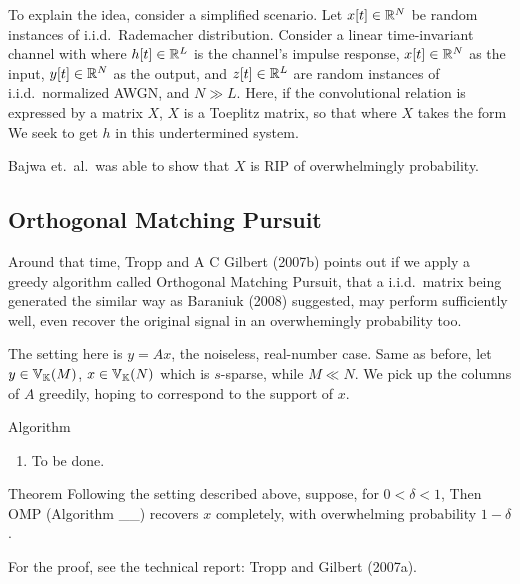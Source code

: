 To explain the idea, consider a simplified scenario.
Let \(x[t] \in \mathbb{R}^N\) be random instances of i.i.d.\ Rademacher distribution.
Consider a linear time-invariant channel with
%
%
where \(h[t] \in \mathbb{R}^L\) is the channel's impulse response, \(x[t] \in \mathbb{R}^N\) as the input, \(y[t] \in \mathbb{R}^N\) as the output, and \(z[t] \in \mathbb{R}^L\) are random instances of i.i.d.\ normalized AWGN, and \(N \gg L\).
Here, if the convolutional relation is expressed by a matrix \(X\), \(X\) is a Toeplitz matrix, so that
%
%
where \(X\) takes the form
%
%
We seek to get \(h\) in this undertermined system.

Bajwa et.\ al.\ was able to show that \(X\) is RIP of overwhelmingly probability.

\subsection{Orthogonal Matching Pursuit}

Around that time, Tropp and A C Gilbert (2007b) points out if we apply a greedy algorithm called Orthogonal Matching Pursuit, that a i.i.d.\ matrix being generated the similar way as Baraniuk (2008) suggested, may perform sufficiently well, even recover the original signal in an overwhemingly probability too.

The setting here is \(y =Ax\), the noiseless, real-number case.
Same as before, let \(y \in \mathbb{V}_{\mathbb{K}}(M)\), \(x \in \mathbb{V}_{\mathbb{K}}(N)\) which is \(s\)-sparse, while \(M \ll N\).
We pick up the columns of \(A\) greedily, hoping to correspond to the support of \(x\).

\Result
{Algorithm}
{
\begin{enumerate}
\item To be done.
\end{enumerate}
}

\Result
{Theorem}
{
Following the setting described above, suppose, for \(0 <\delta <1\),
%
%
Then OMP (Algorithm \_\_) recovers \(x\) completely, with overwhelming probability \(1-\delta\).
}

For the proof, see the technical report: Tropp and Gilbert (2007a).

